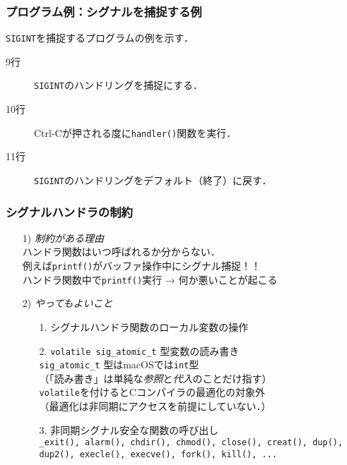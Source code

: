 \documentclass{beamer}                 %
\begin{document}
\begin{frame}[fragile]
  \frametitle{プログラム例：シグナルを捕捉する例}
  \texttt{SIGINT}を捕捉するプログラムの例を示す．

  \begin{quote}
  \end{quote}

  \begin{description}
    \item[9行] \texttt{SIGINT}のハンドリングを捕捉にする．
    \item[10行] Ctrl-Cが押される度に\texttt{handler()}関数を実行．
    \item[11行] \texttt{SIGINT}のハンドリングをデフォルト（終了）に戻す．
  \end{description}
\end{frame}

\begin{frame}[fragile]
  \frametitle{シグナルハンドラの制約}
  \begin{enumerate}
  \item[1)] \emph{制約がある理由} \\
    ハンドラ関数はいつ呼ばれるか分からない．\\
    例えば\texttt{printf()}がバッファ操作中にシグナル捕捉！！ \\
    ハンドラ関数中で\texttt{printf()}実行 → 何か悪いことが起こる
    \vfill
  \item[2)] \emph{やってもよいこと} \\
    \begin{enumerate}
    \item[1.] シグナルハンドラ関数のローカル変数の操作
    \item[2.] \texttt{volatile sig\_atomic\_t} 型変数の読み書き\\
      \texttt{sig\_atomic\_t} 型はmacOSでは\texttt{int}型\\
      （「読み書き」は単純な\emph{参照}と\emph{代入}のことだけ指す）\\
      \texttt{volatile}を付けるとCコンパイラの最適化の対象外\\
      （最適化は非同期にアクセスを前提にしていない．）\\
    \item[3.] 非同期シグナル安全な関数の呼び出し\\
      \texttt{\_exit(), alarm(), chdir(), chmod(), close(), creat(), dup(),
        dup2(), execle(), execve(), fork(), kill(), ...}
    \end{enumerate}
  \end{enumerate}
\end{frame}
\end{document}

